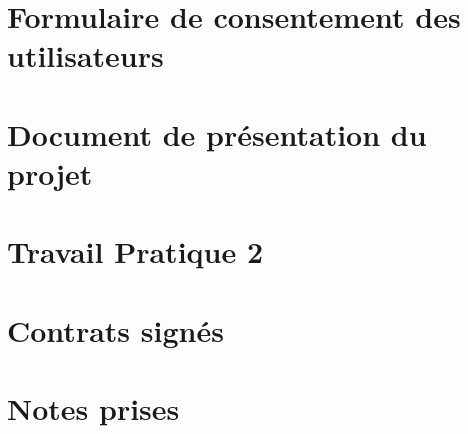 \documentclass[letterpaper, oneside, 12pt, these, creativecommons]{thETS}
\begin{document}
\appendix
\multiannexe

\chapter{Formulaire de consentement des utilisateurs}



\chapter{Document de présentation du projet}



\chapter{Travail Pratique 2}



\chapter{Contrats signés}









\chapter{Notes prises}










\end{document}
